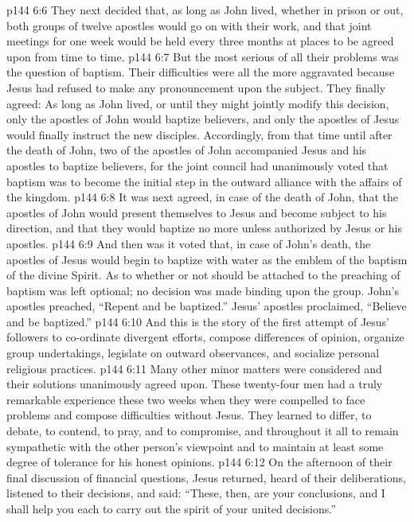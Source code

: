 \vs p144 6:6 They next decided that, as long as John lived, whether in prison or out, both groups of twelve apostles would go on with their work, and that joint meetings for one week would be held every three months at places to be agreed upon from time to time.
\vs p144 6:7 But the most serious of all their problems was the question of baptism. Their difficulties were all the more aggravated because Jesus had refused to make any pronouncement upon the subject. They finally agreed: As long as John lived, or until they might jointly modify this decision, only the apostles of John would baptize believers, and only the apostles of Jesus would finally instruct the new disciples. Accordingly, from that time until after the death of John, two of the apostles of John accompanied Jesus and his apostles to baptize believers, for the joint council had unanimously voted that baptism was to become the initial step in the outward alliance with the affairs of the kingdom.
\vs p144 6:8 It was next agreed, in case of the death of John, that the apostles of John would present themselves to Jesus and become subject to his direction, and that they would baptize no more unless authorized by Jesus or his apostles.
\vs p144 6:9 And then was it voted that, in case of John’s death, the apostles of Jesus would begin to baptize with water as the emblem of the baptism of the divine Spirit. As to whether or not  should be attached to the preaching of baptism was left optional; no decision was made binding upon the group. John’s apostles preached, “Repent and be baptized.” Jesus’ apostles proclaimed, “Believe and be baptized.”
\vs p144 6:10 \pc And this is the story of the first attempt of Jesus’ followers to co\hyp{}ordinate divergent efforts, compose differences of opinion, organize group undertakings, legislate on outward observances, and socialize personal religious practices.
\vs p144 6:11 Many other minor matters were considered and their solutions unanimously agreed upon. These twenty\hyp{}four men had a truly remarkable experience these two weeks when they were compelled to face problems and compose difficulties without Jesus. They learned to differ, to debate, to contend, to pray, and to compromise, and throughout it all to remain sympathetic with the other person’s viewpoint and to maintain at least some degree of tolerance for his honest opinions.
\vs p144 6:12 \pc On the afternoon of their final discussion of financial questions, Jesus returned, heard of their deliberations, listened to their decisions, and said: \textcolor{ubdarkred}{“These, then, are your conclusions, and I shall help you each to carry out the spirit of your united decisions.”}
